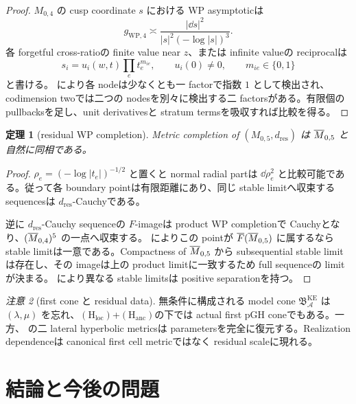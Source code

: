 \documentclass[11pt,a4paper]{ltjsarticle}
\newcommand{\cA}{\mathcal A}\newcommand{\cB}{\mathcal B}\newcommand{\cC}{\mathcal C}
\newcommand{\BKE}{\mathfrak B_{\cA}^{\mathrm{KE}}}
\newcommand{\Hloc}{\ensuremath{(\mathrm H_{\mathrm{loc}})}}
\newcommand{\Hanc}{\ensuremath{(\mathrm H_{\mathrm{anc}})}}
\theoremstyle{plain}
\newtheorem{theorem}{定理}[section]\newtheorem{proposition}[theorem]{命題}
\theoremstyle{definition}
\theoremstyle{remark}
\newtheorem{remark}[theorem]{注意}\newtheorem{warning}[theorem]{警告}
\begin{document}
\begin{proof}
$M_{0,4}$ の cusp coordinate $s$ における WP asymptoticは~\cite{Wolpert}
\[
 g_{\mathrm{WP},4}
 \asymp\frac{|\dd s|^2}{|s|^2(-\log|s|)^3}.
\]
各 forgetful cross-ratioの finite value near $z$、または infinite valueの reciprocalは
\[
 s_i=u_i(w,t)\prod_e t_e^{m_{ie}},
 \qquad
 u_i(0)\ne0,
 \qquad
 m_{ie}\in\{0,1\}
\]
と書ける。 により各 nodeは少なくとも一 factorで指数 $1$ として検出され、codimension twoでは二つの nodesを別々に検出する二 factorsがある。有限個の pullbacksを足し、unit derivativesと stratum termsを吸収すれば比較を得る。
\end{proof}

\begin{theorem}[residual WP completion]\label{thm:res-WP-completion}
Metric completion of $(M_{0,5},d_{\mathrm{res}})$ は $\overline M_{0,5}$ と自然に同相である。
\end{theorem}

\begin{proof}
$\rho_e=(-\log|t_e|)^{-1/2}$ と置くと normal radial partは $\dd\rho_e^2$ と比較可能である。従って各 boundary pointは有限距離にあり、同じ stable limitへ収束する sequencesは $d_{\mathrm{res}}$-Cauchyである。

逆に $d_{\mathrm{res}}$-Cauchy sequenceの $F$-imageは product WP completionで Cauchyとなり、$(\overline M_{0,4})^5$ の一点へ収束する。 によりこの pointが $\overline F(\overline M_{0,5})$ に属するなら stable limitは一意である。Compactness of $\overline M_{0,5}$ から subsequential stable limitは存在し、その imageは上の product limitに一致するため full sequenceの limitが決まる。 により異なる stable limitsは positive separationを持つ。
\end{proof}

\begin{remark}[first cone と residual data]
無条件に構成される model cone $\BKE$ は $(\lambda,\mu)$ を忘れ、\Hloc+\Hanc の下では actual first pGH coneでもある。一方、 の二 lateral hyperbolic metricsは parametersを完全に復元する。Realization dependenceは canonical first cell metricではなく residual scaleに現れる。
\end{remark}

\section{結論と今後の問題}\label{sec:conclusion}
\end{document}
